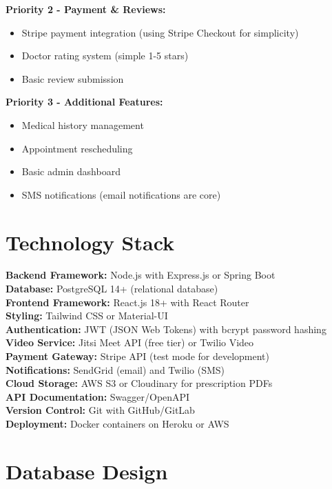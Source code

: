 \documentclass[11pt,a4paper]{article}
\begin{document}
\textbf{Priority 2 - Payment \& Reviews:}
\begin{itemize}[leftmargin=*, itemsep=0.1em]
    \item Stripe payment integration (using Stripe Checkout for simplicity)
    \item Doctor rating system (simple 1-5 stars)
    \item Basic review submission
\end{itemize}

\textbf{Priority 3 - Additional Features:}
\begin{itemize}[leftmargin=*, itemsep=0.1em]
    \item Medical history management
    \item Appointment rescheduling
    \item Basic admin dashboard
    \item SMS notifications (email notifications are core)
\end{itemize}

\section{Technology Stack}

\textbf{Backend Framework:} Node.js with Express.js or Spring Boot\\
\textbf{Database:} PostgreSQL 14+ (relational database)\\
\textbf{Frontend Framework:} React.js 18+ with React Router\\
\textbf{Styling:} Tailwind CSS or Material-UI\\
\textbf{Authentication:} JWT (JSON Web Tokens) with bcrypt password hashing\\
\textbf{Video Service:} Jitsi Meet API (free tier) or Twilio Video\\
\textbf{Payment Gateway:} Stripe API (test mode for development)\\
\textbf{Notifications:} SendGrid (email) and Twilio (SMS)\\
\textbf{Cloud Storage:} AWS S3 or Cloudinary for prescription PDFs\\
\textbf{API Documentation:} Swagger/OpenAPI\\
\textbf{Version Control:} Git with GitHub/GitLab\\
\textbf{Deployment:} Docker containers on Heroku or AWS

\section{Database Design}
\end{document}
